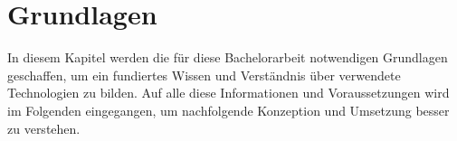 
\chapter{Grundlagen}
\label{chap:Grundlagen}
In diesem Kapitel werden die für diese Bachelorarbeit notwendigen Grundlagen geschaffen, um ein fundiertes Wissen und Verständnis 
über verwendete Technologien zu bilden. Auf alle diese Informationen und Voraussetzungen wird im Folgenden eingegangen, um nachfolgende 
Konzeption und Umsetzung besser zu verstehen.

